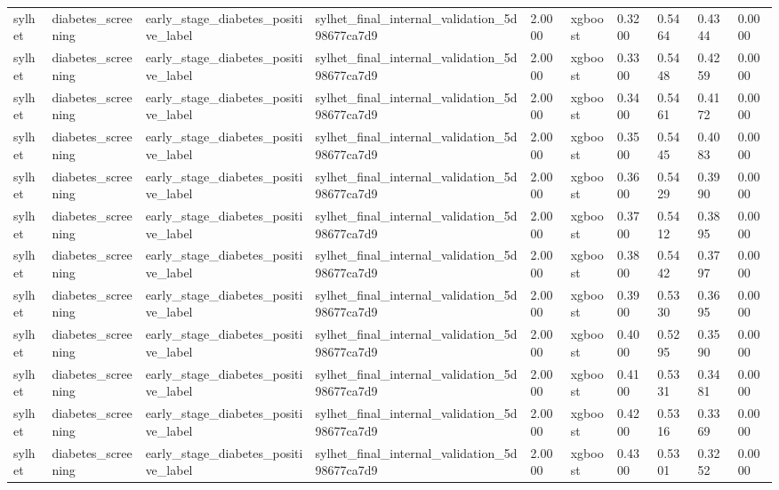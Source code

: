 \begin{tabular}{llllllllll}
sylhet & diabetes\_screening & early\_stage\_diabetes\_positive\_label & sylhet\_final\_internal\_validation\_5d98677ca7d9 & 2.0000 & xgboost & 0.3200 & 0.5464 & 0.4344 & 0.0000 \\
sylhet & diabetes\_screening & early\_stage\_diabetes\_positive\_label & sylhet\_final\_internal\_validation\_5d98677ca7d9 & 2.0000 & xgboost & 0.3300 & 0.5448 & 0.4259 & 0.0000 \\
sylhet & diabetes\_screening & early\_stage\_diabetes\_positive\_label & sylhet\_final\_internal\_validation\_5d98677ca7d9 & 2.0000 & xgboost & 0.3400 & 0.5461 & 0.4172 & 0.0000 \\
sylhet & diabetes\_screening & early\_stage\_diabetes\_positive\_label & sylhet\_final\_internal\_validation\_5d98677ca7d9 & 2.0000 & xgboost & 0.3500 & 0.5445 & 0.4083 & 0.0000 \\
sylhet & diabetes\_screening & early\_stage\_diabetes\_positive\_label & sylhet\_final\_internal\_validation\_5d98677ca7d9 & 2.0000 & xgboost & 0.3600 & 0.5429 & 0.3990 & 0.0000 \\
sylhet & diabetes\_screening & early\_stage\_diabetes\_positive\_label & sylhet\_final\_internal\_validation\_5d98677ca7d9 & 2.0000 & xgboost & 0.3700 & 0.5412 & 0.3895 & 0.0000 \\
sylhet & diabetes\_screening & early\_stage\_diabetes\_positive\_label & sylhet\_final\_internal\_validation\_5d98677ca7d9 & 2.0000 & xgboost & 0.3800 & 0.5442 & 0.3797 & 0.0000 \\
sylhet & diabetes\_screening & early\_stage\_diabetes\_positive\_label & sylhet\_final\_internal\_validation\_5d98677ca7d9 & 2.0000 & xgboost & 0.3900 & 0.5330 & 0.3695 & 0.0000 \\
sylhet & diabetes\_screening & early\_stage\_diabetes\_positive\_label & sylhet\_final\_internal\_validation\_5d98677ca7d9 & 2.0000 & xgboost & 0.4000 & 0.5295 & 0.3590 & 0.0000 \\
sylhet & diabetes\_screening & early\_stage\_diabetes\_positive\_label & sylhet\_final\_internal\_validation\_5d98677ca7d9 & 2.0000 & xgboost & 0.4100 & 0.5331 & 0.3481 & 0.0000 \\
sylhet & diabetes\_screening & early\_stage\_diabetes\_positive\_label & sylhet\_final\_internal\_validation\_5d98677ca7d9 & 2.0000 & xgboost & 0.4200 & 0.5316 & 0.3369 & 0.0000 \\
sylhet & diabetes\_screening & early\_stage\_diabetes\_positive\_label & sylhet\_final\_internal\_validation\_5d98677ca7d9 & 2.0000 & xgboost & 0.4300 & 0.5301 & 0.3252 & 0.0000 \\

\end{tabular}
